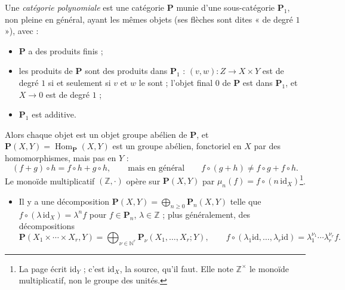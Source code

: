 \documentclass[11pt,a4paper]{article}
\begin{document}
Une \emph{catégorie polynomiale} est une catégorie $\mathbf{P}$ munie d'une
sous-catégorie $\mathbf{P}_{1}$, non pleine en général, ayant les mêmes
objets (ses flèches sont dites « de degré $1$ »), avec :
\begin{itemize}
\item[a)] $\mathbf{P}$ a des produits finis ;
\item[b)] les produits de $\mathbf{P}$ sont des produits dans
$\mathbf{P}_{1}$ : $(v, w) : Z \to X \times Y$ est de degré $1$ si et
seulement si $v$ et $w$ le sont ; l'objet final $0$ de $\mathbf{P}$ est dans
$\mathbf{P}_{1}$, et $X \to 0$ est de degré $1$ ;
\item[c)] $\mathbf{P}_{1}$ est additive.
\end{itemize}
Alors chaque objet est un objet groupe abélien de $\mathbf{P}$, et
$\mathbf{P}(X, Y) = \operatorname{Hom}_{\mathbf{P}}(X, Y)$ est un groupe
abélien, fonctoriel en $X$ par des homomorphismes, mais pas en $Y$ :
\[
  (f + g) \circ h = f \circ h + g \circ h, \qquad \text{mais en général}
  \qquad f \circ (g + h) \neq f \circ g + f \circ h .
\]
Le monoïde multiplicatif $(\mathbb{Z}, \cdot)$ opère sur $\mathbf{P}(X, Y)$
par $\mu_{n}(f) = f \circ (n\, \mathrm{id}_{X})$\footnote{La page écrit
$\mathrm{id}_{Y}$ ; c'est $\mathrm{id}_{X}$, la source, qu'il faut. Elle note
$\mathbb{Z}^{\times}$ le monoïde multiplicatif, non le groupe des unités.}.
\begin{itemize}
\item[d)] Il y a une décomposition $\mathbf{P}(X, Y) = \bigoplus_{n
\geqslant 0} \mathbf{P}_{n}(X, Y)$ telle que $f \circ (\lambda\,
\mathrm{id}_{X}) = \lambda^{n} f$ pour $f \in \mathbf{P}_{n}$, $\lambda \in
\mathbb{Z}$ ; plus généralement, des décompositions
\[
  \mathbf{P}(X_{1} \times \cdots \times X_{r}, Y) = \bigoplus_{\nu \in
  \mathbb{N}^{r}} \mathbf{P}_{\nu}(X_{1}, \ldots, X_{r}; Y), \qquad
  f \circ (\lambda_{1}\mathrm{id}, \ldots, \lambda_{r}\mathrm{id}) =
  \lambda_{1}^{\nu_{1}} \cdots \lambda_{r}^{\nu_{r}} f .
\]
\end{itemize}
\end{document}
